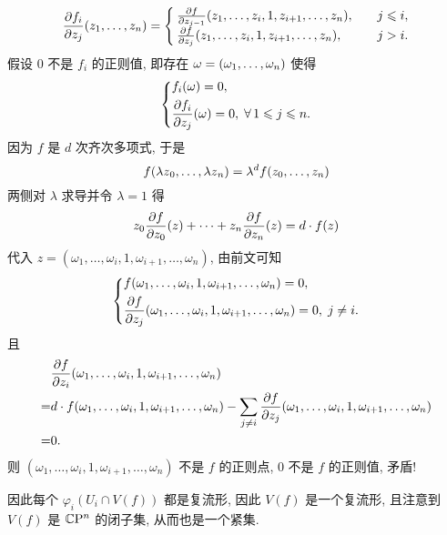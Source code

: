 \begin{example}[齐次多项式零点定义的射影空间的子集]
            \begin{equation*}
                \frac{\partial f_i}{\partial z_j}({z}_{1},\dots,{z}_{n}) =
                \begin{cases}
                    \frac{\partial f}{\partial z_{j-1}}(z_1,\dots,z_{i},1,z_{i+1},\dots,z_n),&\quad j\leqslant i, \\
                    \frac{\partial f}{\partial z_{j}}(z_1,\dots,z_{i},1,z_{i+1},\dots,z_n),&\quad j > i.
                \end{cases}
            \end{equation*}
            假设 $0$ 不是 $f_i$ 的正则值, 即存在 $\omega = ({\omega}_{1},\dots,{\omega}_{n})$ 使得
            \begin{equation*}
                \left\{
                    \begin{aligned}
                        &f_i(\omega) = 0, \\
                        &\frac{\partial f_i}{\partial z_j}(\omega) = 0,\;\forall\,1\leqslant j\leqslant n.
                    \end{aligned}
                \right.
            \end{equation*}
            因为 $f$ 是 $d$ 次齐次多项式, 于是 
            \begin{equation*}
                f({\lambda z}_{0},\dots,{\lambda z}_{n}) = \lambda^{d}f({z}_{0},\dots,{z}_{n})
            \end{equation*}
            两侧对 $\lambda$ 求导并令 $\lambda = 1$ 得 
            \begin{equation*}
                z_0\frac{\partial f}{\partial z_0}(z)+\cdots+z_n\frac{\partial f}{\partial z_n}(z) = d\cdot f(z)
            \end{equation*}
            代入 $z = (\omega_1,\dots,\omega_{i},1,\omega_{i+1},\dots,\omega_n)$, 由前文可知
            \begin{equation*}
                \left\{
                    \begin{aligned}
                        &f(\omega_1,\dots,\omega_{i},1,\omega_{i+1},\dots,\omega_n) = 0, \\
                        &\frac{\partial f}{\partial z_j}(\omega_1,\dots,\omega_{i},1,\omega_{i+1},\dots,\omega_n) = 0,\;j\neq i.
                    \end{aligned}
                \right.
            \end{equation*}
            且
            \begin{align*}
                &\frac{\partial f}{\partial z_i}(\omega_1,\dots,\omega_{i},1,\omega_{i+1},\dots,\omega_n) \\
                =& d\cdot f(\omega_1,\dots,\omega_{i},1,\omega_{i+1},\dots,\omega_n) - \sum_{j \neq i}\frac{\partial f}{\partial z_j}(\omega_1,\dots,\omega_{i},1,\omega_{i+1},\dots,\omega_n) \\
                =& 0.
            \end{align*}
            则 $(\omega_1,\dots,\omega_{i},1,\omega_{i+1},\dots,\omega_n)$ 不是 $f$ 的正则点, $0$ 不是 $f$ 的正则值, 矛盾!
            
            因此每个 $\varphi_i\left(U_i\cap V(f)\right)$ 都是复流形, 因此 $V(f)$ 是一个复流形, 且注意到 $V(f)$ 是 $\mathbb{C}\mathrm{P}^n$ 的闭子集, 从而也是一个紧集.
        \end{example}